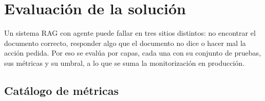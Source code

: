 \section{Evaluación de la solución}\label{sec:evaluacion}

Un sistema RAG con agente puede fallar en tres sitios distintos: no encontrar el documento
correcto, responder algo que el documento no dice o hacer mal la acción pedida. Por eso se evalúa
por capas, cada una con su conjunto de pruebas, sus métricas y su umbral, a lo que se suma la
monitorización en producción.

\subsection{Catálogo de métricas}\label{sec:metricas}

